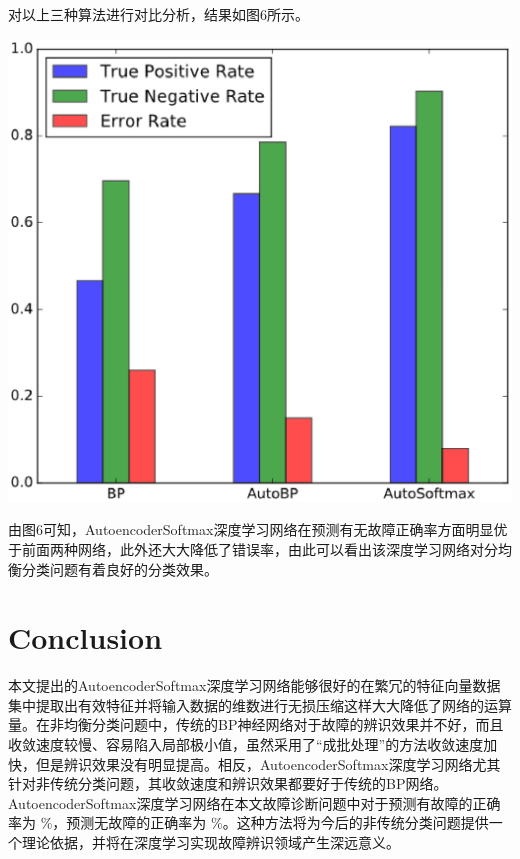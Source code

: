 \documentclass{ctacn}%
\begin{document}
\begin{multicols}{2}
对以上三种算法进行对比分析，结果如图6所示。

\begin{center}
	\includegraphics[scale=0.4, trim=0 0 0 0]{figs/comparison}\\
	\label{fig7}
\end{center}

由图6可知，AutoencoderSoftmax深度学习网络在预测有无故障正确率方面明显优于前面两种网络，此外还大大降低了错误率，由此可以看出该深度学习网络对分均衡分类问题有着良好的分类效果。

\section{Conclusion}

本文提出的AutoencoderSoftmax深度学习网络能够很好的在繁冗的特征向量数据集中提取出有效特征并将输入数据的维数进行无损压缩这样大大降低了网络的运算量。在非均衡分类问题中，传统的BP神经网络对于故障的辨识效果并不好，而且收敛速度较慢、容易陷入局部极小值，虽然采用了``成批处理''的方法收敛速度加快，但是辨识效果没有明显提高。相反，AutoencoderSoftmax深度学习网络尤其针对非传统分类问题，其收敛速度和辨识效果都要好于传统的BP网络。AutoencoderSoftmax深度学习网络在本文故障诊断问题中对于预测有故障的正确率为
\%，预测无故障的正确率为
\%。这种方法将为今后的非传统分类问题提供一个理论依据，并将在深度学习实现故障辨识领域产生深远意义。




\newpage
\end{multicols}
\end{document}
